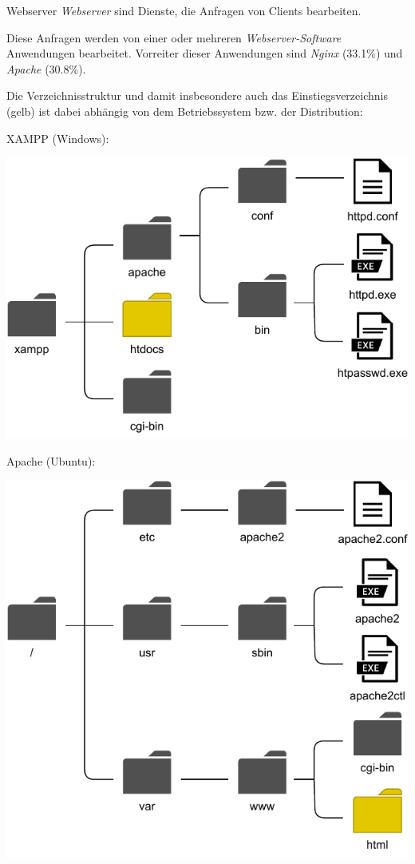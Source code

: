\begin{defi}{Webserver}
    \emph{Webserver} sind Dienste, die Anfragen von Clients bearbeiten.
    
    Diese Anfragen werden von einer oder mehreren \emph{Webserver-Software} Anwendungen bearbeitet.
    Vorreiter dieser Anwendungen sind \emph{Nginx} (33.1\%) und \emph{Apache} (30.8\%).
    
    Die Verzeichnisstruktur und damit insbesondere auch das Einstiegsverzeichnis (gelb) ist dabei abhängig von dem Betriebssystem bzw. der Distribution:
    
    \begin{minipage}[t]{.5\textwidth}
        XAMPP (Windows):
        
        \centering
        \includegraphics[width=.9\textwidth]{includes/figures/defi_xampp.pdf}
    \end{minipage}%
    \begin{minipage}[t]{.5\textwidth}
        Apache (Ubuntu):
        
        \centering
        \includegraphics[width=.9\textwidth]{includes/figures/defi_apache.pdf}
    \end{minipage}
\end{defi}

